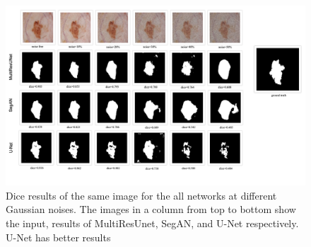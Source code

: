 \begin{figure}
    \centerline{\includegraphics[width=1\columnwidth]{05-results/figures/extended_results_sample_unet_over_gan.png}}
    \caption{Dice results of the same image for the all networks at different Gaussian noises. The images in a column from top to bottom show the input, results of MultiResUnet, SegAN, and U-Net respectively. U-Net has better results}
    \label{figure:all-noises-with-results-dice-multiresunet-over-segan}
\end{figure}
